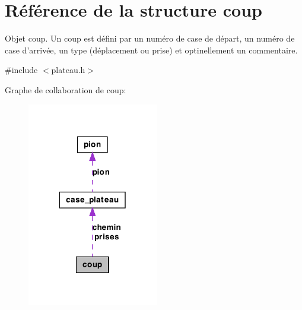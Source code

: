 \hypertarget{structcoup}{
\section{Référence de la structure coup}
\label{structcoup}
}


Objet coup. Un coup est défini par un numéro de case de départ, un numéro de case d'arrivée, un type (déplacement ou prise) et optinellement un commentaire.  




{\ttfamily \#include $<$plateau.h$>$}



Graphe de collaboration de coup:\nopagebreak
\begin{figure}[H]
\begin{center}
\leavevmode
\includegraphics[width=162pt]{structcoup__coll__graph}
\end{center}
\end{figure}
